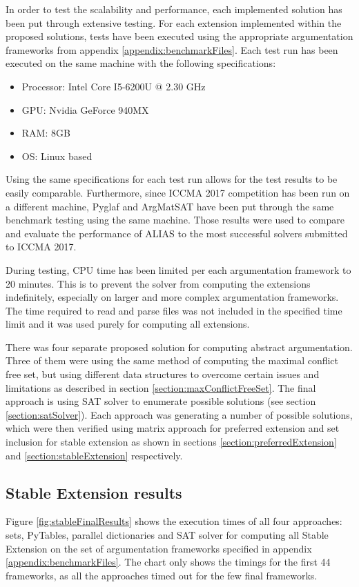 In order to test the scalability and performance, each implemented solution has been put through extensive testing. For each extension implemented within the proposed solutions, tests have been executed using the appropriate argumentation frameworks from appendix \ref{appendix:benchmarkFiles}. Each test run has been executed on the same machine with the following specifications:

\begin{itemize}
	\item Processor: Intel Core I5-6200U @ 2.30 GHz
	\item GPU: Nvidia GeForce 940MX
	\item RAM: 8GB
	\item OS: Linux based
\end{itemize}

Using the same specifications for each test run allows for the test results to be easily comparable. Furthermore, since ICCMA 2017 competition has been run on a different machine, Pyglaf \citep{pyglaf} and ArgMatSAT \citep{argmatSat} have been put through the same benchmark testing using the same machine. Those results were used to compare and evaluate the performance of ALIAS to the most successful solvers submitted to ICCMA 2017.

During testing, CPU time has been limited per each argumentation framework to 20 minutes. This is to prevent the solver from computing the extensions indefinitely, especially on larger and more complex argumentation frameworks. The time required to read and parse files was not included in the specified time limit and it was used purely for computing all extensions. 

There was four separate proposed solution for computing abstract argumentation. Three of them were using the same method of computing the maximal conflict free set, but using different data structures to overcome certain issues and limitations as described in section \ref{section:maxConflictFreeSet}. The final approach is using SAT solver to enumerate possible solutions (see section \ref{section:satSolver}). Each approach was generating a number of possible solutions, which were then verified using matrix approach for preferred extension and set inclusion for stable extension as shown in sections \ref{section:preferredExtension} and \ref{section:stableExtension} respectively. 

\subsection{Stable Extension results} \label{section:stableExtensionResults}
Figure \ref{fig:stableFinalResults} shows the execution times of all four approaches: sets, PyTables, parallel dictionaries and SAT solver for computing all Stable Extension on the set of argumentation frameworks specified in appendix \ref{appendix:benchmarkFiles}. The chart only shows the timings for the first 44 frameworks, as all the approaches timed out for the few final frameworks.

